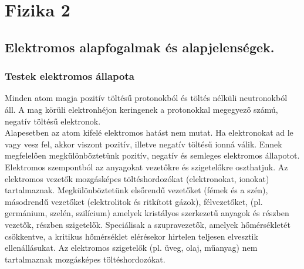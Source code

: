 \section{Fizika 2}
\subsection{Elektromos alapfogalmak és alapjelenségek.}
\subsubsection{Testek elektromos állapota}
Minden atom magja pozitív töltésű protonokból és töltés nélküli neutronokból áll. A mag körüli elektronhéjon keringenek a protonokkal megegyező számú, negatív töltésű elektronok.\\
Alapesetben az atom kifelé elektromos hatást nem mutat. Ha elektronokat ad le vagy vesz fel, akkor viszont pozitív, illetve negatív töltésű ionná válik. Ennek megfelelően megkülönböztetünk pozitív, negatív és semleges elektromos állapotot.\\
Elektromos szempontból az anyagokat vezetőkre és szigetelőkre oszthatjuk. Az elektromos vezetők mozgásképes töltéshordozókat (elektronokat, ionokat) tartalmaznak. Megkülönböztetünk elsőrendű vezetőket (fémek és a szén), másodrendű vezetőket (elektrolitok és ritkított gázok), félvezetőket, (pl. germánium, szelén, szilícium) amelyek kristályos szerkezetű anyagok és részben vezetők, részben szigetelők. Speciálisak a szupravezetők, amelyek hőmérsékletét csökkentve, a kritikus hőmérséklet elérésekor hirtelen teljesen elvesztik ellenállásukat. Az elektromos szigetelők (pl. üveg, olaj, műanyag) nem tartalmaznak mozgásképes töltéshordozókat.

